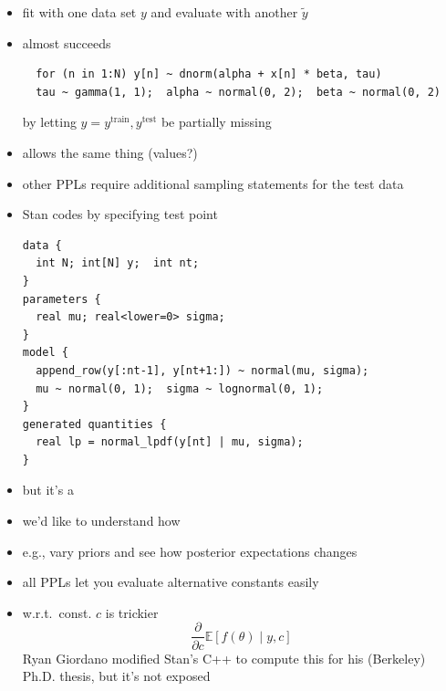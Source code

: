 \documentclass[10pt]{report}
\begin{document}
\begin{itemize}
\item fit with one data set $y$
  and evaluate with another $\tilde{y}$
\item {} almost succeeds
\vspace*{-8pt}
{\footnotesize 
\begin{verbatim}
  for (n in 1:N) y[n] ~ dnorm(alpha + x[n] * beta, tau)
  tau ~ gamma(1, 1);  alpha ~ normal(0, 2);  beta ~ normal(0, 2)
\end{verbatim}
\vspace*{-8pt}}
by letting $y = y^{\textrm{train}}, y^{\textrm{test}}$ be partially
missing
\item {} allows the same thing (values?)
\item other PPLs require additional sampling statements for the test data
\end{itemize}  

\begin{itemize}
\item Stan codes  by specifying test point
\vspace*{-6pt}
{\footnotesize 
\begin{verbatim}
data { 
  int N; int[N] y;  int nt;
}
parameters { 
  real mu; real<lower=0> sigma;
}
model { 
  append_row(y[:nt-1], y[nt+1:]) ~ normal(mu, sigma);
  mu ~ normal(0, 1);  sigma ~ lognormal(0, 1);
}
generated quantities {
  real lp = normal_lpdf(y[nt] | mu, sigma);
}
\end{verbatim}
  \vspace*{-8pt}}
\item but it's a 
\end{itemize}

\begin{itemize}
\item we'd like to understand how 
\item e.g., vary priors and see how posterior expectations changes
\item all PPLs let you evaluate alternative constants easily
\item {} w.r.t.\ const. $c$ is trickier
  \[
    \frac{\partial}{\partial c} \mathbb{E}[f(\theta) \mid y, c]
  \]
  Ryan Giordano modified Stan's C++ to compute this for his (Berkeley)
  Ph.D. thesis, but it's not exposed
\end{itemize}  
\end{document}
